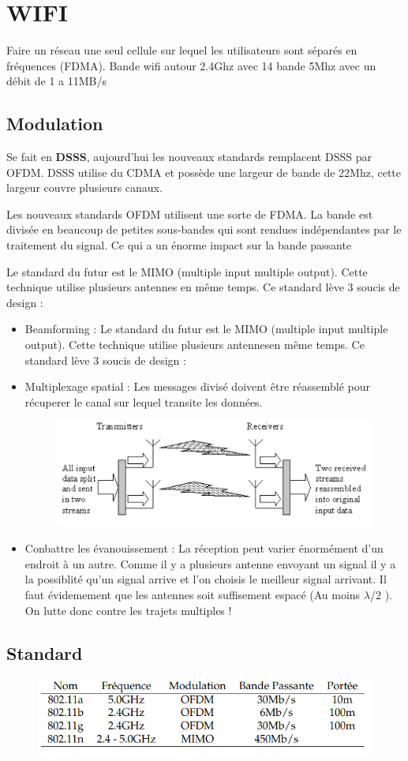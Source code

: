\documentclass[12pt]{article}
\begin{document}
\section{WIFI}
	Faire un réseau une seul cellule sur lequel les utilisateurs sont séparés en fréquences (FDMA). Bande wifi autour 2.4Ghz avec 14 bande 5Mhz avec un débit de 1 a 11MB/s
	\subsection{Modulation}
		Se fait en \textbf{DSSS}, aujourd’hui les nouveaux standards remplacent DSSS par OFDM. DSSS utilise du CDMA et possède une largeur de bande de 22Mhz, cette largeur couvre plusieurs canaux.
		
		Les nouveaux standards OFDM utilisent une sorte de FDMA. La bande est divisée en beaucoup de petites sous-bandes qui sont rendues indépendantes par le traitement du signal. Ce qui a un énorme impact sur la bande passante
		
		Le standard du futur est le MIMO (multiple input multiple output). Cette technique utilise plusieurs antennes en même temps. Ce standard lève 3 soucis de design :
		
		\begin{itemize}
			\item Beamforming : Le standard du futur est le MIMO (multiple input multiple output). Cette technique utilise plusieurs antennesen même temps. Ce standard lève 3 soucis de design :
			\item Multiplexage spatial : Les messages divisé doivent être réassemblé pour récuperer le canal sur lequel transite les données. 
			
				\begin{figure}[H]
					\centering
					\includegraphics[width=\textwidth]{img/wifi/M.png}
				\end{figure}
			\item Conbattre les évanouissement : La réception peut varier énormément d’un endroit à un autre. Comme il y a plusieurs antenne envoyant un signal il y a la possiblité qu’un signal arrive et l’on choisis le meilleur signal arrivant. Il faut évidemement que les antennes soit suffisement espacé (Au moins $\lambda$/2 ).
On lutte donc contre les trajets multiples !
		\end{itemize}
		
	\subsection{Standard}
		\begin{figure}[H]
			\centering
			\includegraphics[width=\textwidth]{img/wifi/S.png}
		\end{figure}
		
\end{document}
